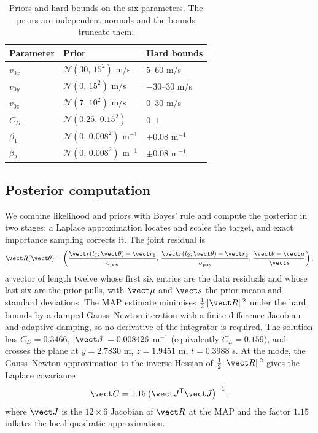 \begin{table}[t]
  \centering
  \caption{Priors and hard bounds on the six parameters. The priors are
  independent normals and the bounds truncate them.}
  \label{tab:priors}
  \begin{tabular}{@{}lll@{}}
    \toprule
    Parameter & Prior & Hard bounds \\
    \midrule
    $v_{0x}$ & $\mathcal N(30,\,15^2)$ m/s & $5$--$60$ m/s \\
    $v_{0y}$ & $\mathcal N(0,\,15^2)$ m/s & $-30$--$30$ m/s \\
    $v_{0z}$ & $\mathcal N(7,\,10^2)$ m/s & $0$--$30$ m/s \\
    $C_D$ & $\mathcal N(0.25,\,0.15^2)$ & $0$--$1$ \\
    $\beta_1$ & $\mathcal N(0,\,0.008^2)$ m$^{-1}$ & $\pm0.08$ m$^{-1}$ \\
    $\beta_2$ & $\mathcal N(0,\,0.008^2)$ m$^{-1}$ & $\pm0.08$ m$^{-1}$ \\
    \bottomrule
  \end{tabular}
\end{table}

\subsection{Posterior computation}
\label{sec:sampling}

We combine likelihood and priors with Bayes' rule and compute the posterior in
two stages: a Laplace approximation locates and scales the target, and exact
importance sampling corrects it. The joint residual is
\begin{equation}
  \vect R(\vect\theta)=\left(
  \frac{\vect r(t_1;\vect\theta)-\vect r_1}{\sigma_{\rm pos}},\,
  \frac{\vect r(t_2;\vect\theta)-\vect r_2}{\sigma_{\rm pos}},\,
  \frac{\vect\theta-\vect\mu}{\vect s}\right),
  \label{eq:residual}
\end{equation}
a vector of length twelve whose first six entries are the data residuals and
whose last six are the prior pulls, with $\vect\mu$ and $\vect s$ the prior
means and standard deviations. The MAP estimate minimises
$\tfrac12\|\vect R\|^2$ under the hard bounds by a damped Gauss--Newton iteration
with a finite-difference Jacobian and adaptive damping, so no derivative of the
integrator is required. The solution has $C_D=0.3466$,
$|\vect\beta|=0.008426$ m$^{-1}$ (equivalently $C_L=0.159$), and crosses the
plane at $y=2.7830$ m, $z=1.9451$ m, $t=0.3988$ s. At the mode, the
Gauss--Newton approximation to the inverse Hessian of $\tfrac12\|\vect R\|^2$
gives the Laplace covariance
\begin{equation}
  \vect C=1.15\left(\vect J^{\mathsf T}\vect J\right)^{-1},
  \label{eq:laplace}
\end{equation}
where $\vect J$ is the $12\times6$ Jacobian of $\vect R$ at the MAP and the
factor $1.15$ inflates the local quadratic approximation.

